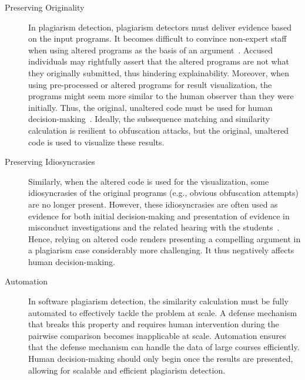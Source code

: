 \begin{description}
    \item[Preserving Originality] In plagiarism detection, plagiarism detectors must deliver evidence based on the input programs. 
    It becomes difficult to convince non-expert staff when using altered programs as the basis of an argument~\cite{Le2013}. Accused individuals may rightfully assert that the altered programs are not what they originally submitted, thus hindering explainability.
    Moreover, when using pre-processed or altered programs for result visualization, the programs might seem more similar to the human observer than they were initially.
    Thus, the original, unaltered code must be used for human decision-making~\cite{Le2013}.
    Ideally, the subsequence matching and similarity calculation is resilient to obfuscation attacks, but the original, unaltered code is used to visualize these results.
    
    \item[Preserving Idiosyncrasies] Similarly, when the altered code is used for the visualization, some idiosyncrasies of the original programs (e.g., obvious obfuscation attempts) are no longer present. However, these idiosyncrasies are often used as evidence for both initial decision-making and presentation of evidence in misconduct investigations and the related hearing with the students~\cite{Novak2019, Denzler2024}. Hence, relying on altered code renders presenting a compelling argument in a plagiarism case considerably more challenging. It thus negatively affects human decision-making.
    
    \item[Automation] In software plagiarism detection, the similarity calculation must be fully automated to effectively tackle the problem at scale. A defense mechanism that breaks this property and requires human intervention during the pairwise comparison becomes inapplicable at scale. Automation ensures that the defense mechanism can handle the data of large courses efficiently. Human decision-making should only begin once the results are presented, allowing for scalable and efficient plagiarism detection.
     
\end{description}






